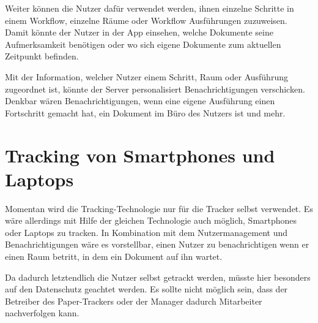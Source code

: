 Weiter können die Nutzer dafür verwendet werden, ihnen einzelne Schritte in einem Workflow, einzelne Räume
oder Workflow Ausführungen zuzuweisen.
Damit könnte der Nutzer in der App einsehen, welche Dokumente seine Aufmerksamkeit benötigen oder wo sich eigene Dokumente
zum aktuellen Zeitpunkt befinden.

Mit der Information, welcher Nutzer einem Schritt, Raum oder Ausführung zugeordnet ist, könnte der Server personalisiert
Benachrichtigungen verschicken.
Denkbar wären Benachrichtigungen, wenn eine eigene Ausführung einen Fortschritt gemacht hat, ein Dokument im Büro
des Nutzers ist und mehr.

\section{Tracking von Smartphones und Laptops}

Momentan wird die Tracking-Technologie nur für die Tracker selbst verwendet.
Es wäre allerdings mit Hilfe der gleichen Technologie auch möglich, Smartphones oder Laptops zu tracken.
In Kombination mit dem Nutzermanagement und Benachrichtigungen wäre es vorstellbar, einen Nutzer zu benachrichtigen
wenn er einen Raum betritt, in dem ein Dokument auf ihn wartet.

Da dadurch letztendlich die Nutzer selbst getrackt werden, müsste hier besonders auf den Datenschutz geachtet werden.
Es sollte nicht möglich sein, dass der Betreiber des Paper-Trackers oder der Manager dadurch Mitarbeiter nachverfolgen kann.
